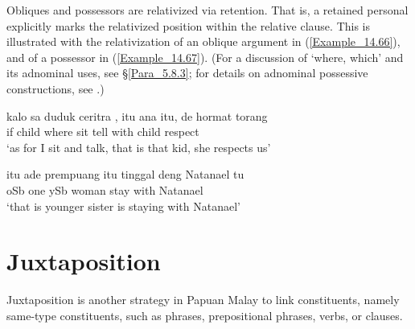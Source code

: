 Obliques and possessors are relativized via  retention. That is, a retained personal  explicitly marks the relativized position within the relative clause. This is illustrated with the relativization of an oblique argument in (\ref{Example_14.66}), and of a possessor in (\ref{Example_14.67}). (For a discussion of   ‘where, which’ and its adnominal uses, see §\ref{Para_5.8.3}; for details on adnominal possessive constructions, see .)

\ea
\label{Example_14.66}

\gll kalo        sa  duduk  ceritra    , itu  ana  itu,  de  hormat  torang\\  
if  child  where      sit  tell  with     child      respect  \\
\glt ‘as for  I sit and talk, that is that kid, she respects us’ \textstyleExampleSource{[081115-001a-Cv.0282]}
\z

\ea
\label{Example_14.67}

\gll  itu              ade  prempuang itu  tinggal  deng  Natanael  tu\\  
  oSb  one          ySb  woman   stay  with  Natanael  \\
\glt ‘that is  younger sister is staying with Natanael’ \textstyleExampleSource{[080922-001a-CvPh.0888]}
\z


\section{Juxtaposition}
\label{Para_14.4}
Juxtaposition is another strategy in Papuan Malay to link constituents, namely same-type constituents, such as  phrases, prepositional phrases, verbs, or clauses.

